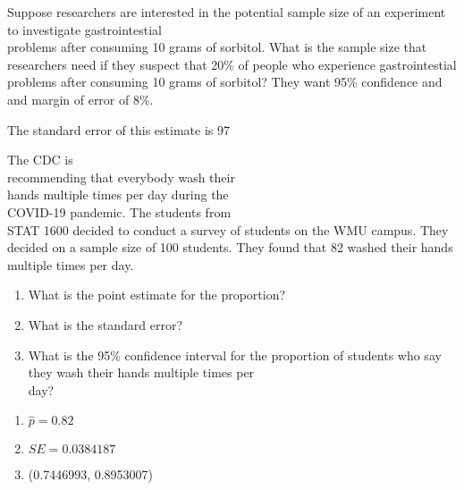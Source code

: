 \documentclass[11pt]{book}\usepackage[]{graphicx}\usepackage[]{color}
\begin{document}
\begin{exercises}
  \begin{exercise} %



Suppose researchers are interested in the potential sample size of an experiment to investigate gastrointestial \\ problems after consuming 10 grams of sorbitol.  What is the sample size that \\ researchers need if they suspect that 20\% of people who experience gastrointestial problems after consuming 10 grams of sorbitol?  They want 95\% confidence and and margin of error of 8\%.

  \end{exercise}
  \begin{solution} %

The standard error of this estimate is 97

  \end{solution}

  \begin{exercise}   %



The CDC is \\ recommending that everybody wash their \\ hands multiple  times per day during the \\ COVID-19  pandemic.  The students from \\ STAT 1600  decided to conduct a survey of students on the WMU campus.  They decided on a sample size of 100 students.  They found that 82  washed their hands multiple times per day.

\begin{enumerate}
\item What is the point estimate for the proportion?
\item What is the standard error?
\item What is the 95\% confidence interval for the proportion of students who say they wash their hands multiple times per \\ day?
\end{enumerate}

  \end{exercise}
  \begin{solution}   %

\begin{enumerate}
\item $\hat{p} = 0.82$
\item $SE = 0.0384187$
\item (0.7446993, 0.8953007)
\end{enumerate}

  \end{solution}

\end{exercises}
\end{document}

